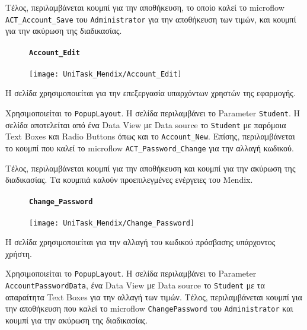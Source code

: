                     Τέλος, περιλαμβάνεται κουμπί για την αποθήκευση, το οποίο καλεί το microflow \texttt{ACT\_Account\_Save} του \texttt{Administrator} για την αποθήκευση των τιμών, και κουμπί για την ακύρωση της διαδικασίας.

                \begin{figure}[H] \noindent
                    \paragraph{\texttt{Account\_Edit}}
                    \begin{center}
                        \texttt{[image: UniTask\_Mendix/Account\_Edit]}
                    \end{center}
                \end{figure}

                    Η σελίδα χρησιμοποιείται για την επεξεργασία υπαρχόντων χρηστών της εφαρμογής.

                    Χρησιμοποιείται το \texttt{PopupLayout}. Η σελίδα περιλαμβάνει το Parameter \texttt{Student}. Η σελίδα αποτελείται από ένα Data View με Data source το \texttt{Student} με παρόμοια Text Boxes και Radio Buttons όπως και το \texttt{Account\_New}. Επίσης, περιλαμβάνεται το κουμπί που καλεί το microflow \texttt{ACT\_Password\_Change} για την αλλαγή κωδικού.

                    Τέλος, περιλαμβάνεται κουμπί για την αποθήκευση και κουμπί για την ακύρωση της διαδικασίας. Τα κουμπιά καλούν προεπιλεγμένες ενέργειες του Mendix.

                \begin{figure}[H] \noindent
                    \paragraph{\texttt{Change\_Password}}
                    \begin{center}
                        \texttt{[image: UniTask\_Mendix/Change\_Password]}
                    \end{center}
                \end{figure}

                    Η σελίδα χρησιμοποιείται για την αλλαγή του κωδικού πρόσβασης υπάρχοντος χρήστη.

                    Χρησιμοποιείται το \texttt{PopupLayout}. Η σελίδα περιλαμβάνει το Parameter \linebreak \texttt{AccountPasswordData}, ένα Data View με Data source το \texttt{Student} με τα απαραίτητα Text Boxes για την αλλαγή των τιμών. Τέλος, περιλαμβάνεται κουμπί για την αποθήκευση που καλεί το microflow \texttt{ChangePassword} του \texttt{Administrator} και κουμπί για την ακύρωση της διαδικασίας.

